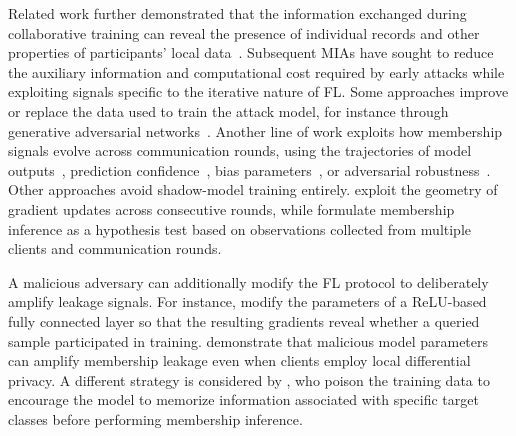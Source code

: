 Related work further demonstrated that the information exchanged during collaborative training can reveal the presence of individual records and other properties of participants' local data~\cite{melis2018exploitingunintendedfeatureleakage}. Subsequent MIAs have sought to reduce the auxiliary information and computational cost required by early attacks while exploiting signals specific to the iterative nature of FL. Some approaches improve or replace the data used to train the attack model, for instance through generative adversarial networks~\cite{zhang_gan_mia}. Another line of work exploits how membership signals evolve across communication rounds, using the trajectories of model outputs~\cite{zari2021efficientpassivemembershipinference}, prediction confidence~\cite{gu_mia}, bias parameters~\cite{Zhang_mia}, or adversarial robustness~\cite{liu_mia}. Other approaches avoid shadow-model training entirely.  exploit the geometry of gradient updates across consecutive rounds, while  formulate membership inference as a hypothesis test based on observations collected from multiple clients and communication rounds.

A malicious adversary can additionally modify the FL protocol to deliberately amplify leakage signals. For instance,  modify the parameters of a ReLU-based fully connected layer so that the resulting gradients reveal whether a queried sample participated in training.  demonstrate that malicious model parameters can amplify membership leakage even when clients employ local differential privacy. A different strategy is considered by , who poison the training data to encourage the model to memorize information associated with specific target classes before performing membership inference.

